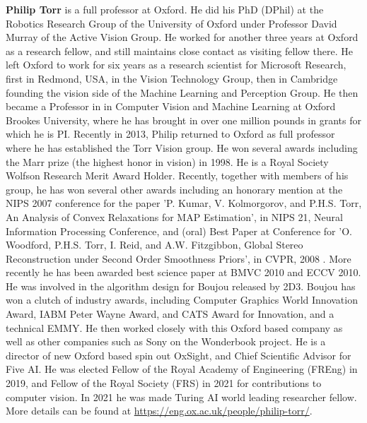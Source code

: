 \documentclass[10pt]{article} %
\begin{document}
\textbf{Philip Torr} is a full professor at Oxford. He did his PhD (DPhil) at the Robotics Research Group of the University of Oxford under Professor David Murray of the Active Vision Group. He worked for another three years at Oxford as a research fellow, and still maintains close contact as visiting fellow there. He left Oxford to work for six years as a research scientist for Microsoft Research, first in Redmond, USA, in the Vision Technology Group, then in Cambridge founding the vision side of the Machine Learning and Perception Group. He then became a Professor in in Computer Vision and Machine Learning at Oxford Brookes University, where he has brought in over one million pounds in grants for which he is PI. Recently in 2013, Philip returned to Oxford as full professor where he has established the Torr Vision group. He won several awards including the Marr prize (the highest honor in vision) in 1998. He is a Royal Society Wolfson Research Merit Award Holder. Recently, together with members of his group, he has won several other awards including an honorary mention at the NIPS 2007 conference for the paper 'P. Kumar, V. Kolmorgorov, and P.H.S. Torr, An Analysis of Convex Relaxations for MAP Estimation', in NIPS 21, Neural Information Processing Conference, and (oral) Best Paper at Conference for 'O. Woodford, P.H.S. Torr, I. Reid, and A.W. Fitzgibbon, Global Stereo Reconstruction under Second Order Smoothness Priors', in CVPR, 2008 . More recently he has been awarded best science paper at BMVC 2010 and ECCV 2010. He was involved in the algorithm design for Boujou released by 2D3. Boujou has won a clutch of industry awards, including Computer Graphics World Innovation Award, IABM Peter Wayne Award, and CATS Award for Innovation, and a technical EMMY. He then worked closely with this Oxford based company as well as other companies such as Sony on the Wonderbook project. He is a director of new Oxford based spin out OxSight, and Chief Scientific Advisor for Five AI. He was elected Fellow of the Royal Academy of Engineering (FREng) in 2019, and Fellow of the Royal Society (FRS) in 2021 for contributions to computer vision. In 2021 he was made Turing AI world leading researcher fellow. More details can be found at \href{https://eng.ox.ac.uk/people/philip-torr/}{https://eng.ox.ac.uk/people/philip-torr/}.
\end{document}
